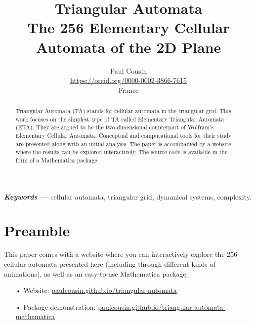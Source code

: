 \documentclass{article}
\providecommand{\keywords}[1]
{
  \small	
  \textbf{\textit{Keywords ---}} #1
}
\begin{document}
\title{\Huge Triangular Automata \\
\Large The 256 Elementary Cellular Automata of the 2D Plane}

\author{Paul Cousin \\
        \small \href{https://orcid.org/0000-0002-3866-7615}{https://orcid.org/0000-0002-3866-7615} \\
        \small France
}

\date{}

\maketitle

\begin{abstract}
Triangular Automata (TA) stands for cellular automata in the triangular grid. This work focuses on the simplest type of TA called Elementary Triangular Automata (ETA). They are argued to be the two-dimensional counterpart of Wolfram's Elementary Cellular Automata. Conceptual and computational tools for their study are presented along with an initial analysis. The paper is accompanied by a website where the results can be explored interactively. The source code is available in the form of a Mathematica package. \smallskip
\end{abstract} 

\keywords{cellular automata, triangular grid, dynamical systems, complexity.}

\bigskip

\section{Preamble} \label{preamble}
This paper comes with a website where you can interactively explore the 256 cellular automata presented here (including through different kinds of animations), as well as an easy-to-use Mathematica package.

\begin{enumerate}
    \item[•]\hspace{-1.5mm} Website: \href{https://paulcousin.github.io/triangular-automata}{paulcousin.github.io/triangular-automata}
    \item[•]\hspace{-1.5mm} Package demonstration: \href{https://paulcousin.github.io/triangular-automata-mathematica}{paulcousin.github.io/triangular-automata-mathematica}
\end{enumerate}
\end{document}

